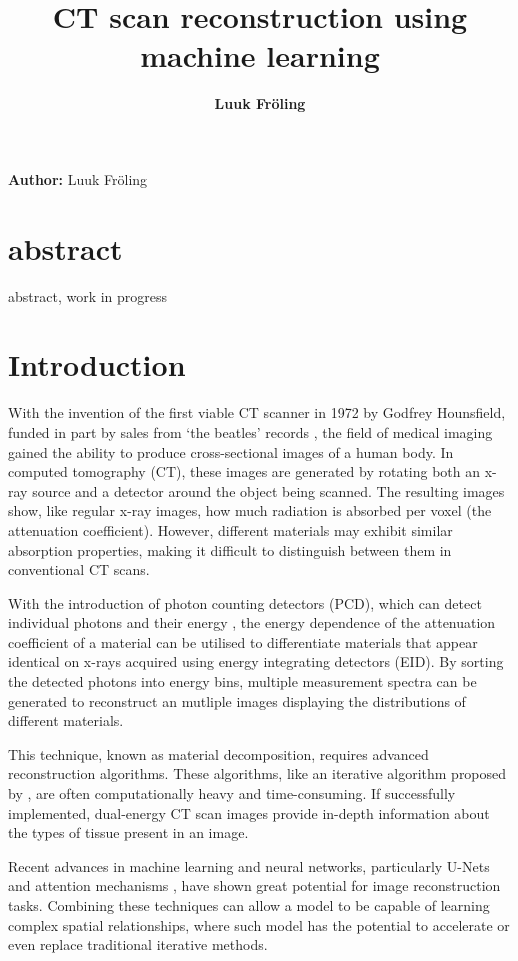 \documentclass{article}
\title{CT scan reconstruction using machine learning}
\date{\displaydate{articleDate}}
\author{\bfseries Luuk Fröling\mdseries\\}
\begin{document}
\maketitle

\textbf{Author:} Luuk Fröling

\section{abstract}

abstract, work in progress

\section{Introduction}

With the invention of the first viable CT scanner in 1972 by Godfrey Hounsfield, funded in part by sales from `the beatles' records \citep{pietzsch2025ct}, the field of medical imaging gained the ability to produce cross-sectional images of a human body. In computed tomography (CT), these images are generated by rotating both an x-ray source and a detector around the object being scanned. The resulting images show, like regular x-ray images, how much radiation is absorbed per voxel (the attenuation coefficient). However, different materials may exhibit similar absorption properties, making it difficult to distinguish between them in conventional CT scans.

With the introduction of photon counting detectors (PCD), which can detect individual photons and their energy \citep{taguchi2013photon}, the energy dependence of the attenuation coefficient of a material can be utilised to differentiate materials that appear identical on x-rays acquired using energy integrating detectors (EID). By sorting the detected photons into energy bins, multiple measurement spectra can be generated to reconstruct an mutliple images displaying the distributions of different materials.

This technique, known as material decomposition, requires advanced reconstruction algorithms. These algorithms, like an iterative algorithm proposed by \citep{mechlem2018joint}, are often computationally heavy and time-consuming. If successfully implemented, dual-energy CT scan images provide in-depth information about the types of tissue present in an image.

Recent advances in machine learning and neural networks, particularly U-Nets \citep{oktay2018attentionunet} and attention mechanisms  \citep{vaswani2017attention}, have shown great potential for image reconstruction tasks. Combining these techniques can allow a model to be capable of learning complex spatial relationships, where such model has the potential to accelerate or even replace traditional iterative methods.
\end{document}
